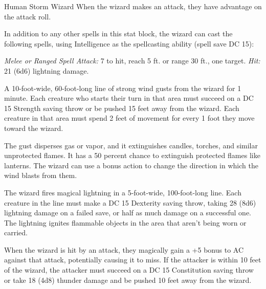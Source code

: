 \documentclass[10pt,a4paper,twoside,bg=print,twocolumn,openany,nodeprecatedcode]{dndbook}
\begin{document}
\begin{DndMonster}[float=t]{Human Storm Wizard}
\DndMonsterBasics[
armor-class = {12 (15 with \textit{mage armor})},
hit-points = {\DndDice{10d8 + 30}},
speed = {30 ft.}
]
\DndMonsterAbilityScores[
 str = 10,
 dex = 14,
 con = 16,
 int = 18,
 wis = 14,
 cha = 10
]
\DndMonsterDetails[
saving-throws = {Int +7, Wis +5},
skills = {Arcana +7, History +7},
languages = {Common plus any two languages},
challenge = 6,
]
When the wizard makes an attack, they have advantage on the attack roll.

In addition to any other spells in this stat block, the wizard can cast the following spells, using Intelligence as the spellcasting ability (spell save DC 15):
\begin{DndMonsterSpells}
\end{DndMonsterSpells}
\textsl{Melee or Ranged Spell Attack:} 7 to hit, reach 5 ft. or range 30 ft., one target. \textsl{Hit:} 21 (6d6) lightning damage.

A 10-foot-wide, 60-foot-long line of strong wind gusts from the wizard for 1 minute. Each creature who starts their turn in that area must succeed on a DC 15 Strength saving throw or be pushed 15 feet away from the wizard. Each creature in that area must spend 2 feet of movement for every 1 foot they move toward the wizard.

The gust disperses gas or vapor, and it extinguishes candles, torches, and similar unprotected flames. It has a 50 percent chance to extinguish protected flames like lanterns. The wizard can use a bonus action to change the direction in which the wind blasts from them.

The wizard fires magical lightning in a 5-foot-wide, 100-foot-long line. Each creature in the line must make a DC 15 Dexterity saving throw, taking 28 (8d6) lightning damage on a failed save, or half as much damage on a successful one. The lightning ignites flammable objects in the area that aren't being worn or carried.

When the wizard is hit by an attack, they magically gain a +5 bonus to AC against that attack, potentially causing it to miss. If the attacker is within 10 feet of the wizard, the attacker must succeed on a DC 15 Constitution saving throw or take 18 (4d8) thunder damage and be pushed 10 feet away from the wizard.

\end{DndMonster}
\end{document}
